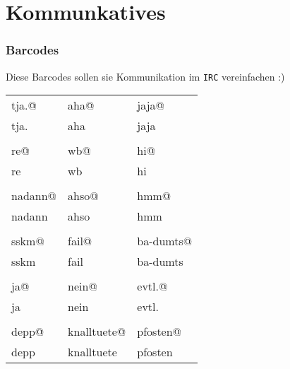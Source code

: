 \documentclass[oneside,12pt,a4paper]{scrartcl}
\makeatletter
\newcommand{\barcode}[1]{{\xlix@#1@}}
\makeatother
\begin{document}
\part{Kommunkatives}

\newpage
\section{Barcodes}
Diese Barcodes sollen sie Kommunikation im \texttt{IRC} vereinfachen :) \newline

\begin{tabularx}{\textwidth}{m{5cm}m{5cm}m{5cm}}
  \barcode{tja.} & \barcode{aha} & \barcode{jaja} \\
   tja. & aha & jaja \\

\\
  \barcode{re} & \barcode{wb} & \barcode{hi} \\
   re & wb & hi \\

\\
  \barcode{nadann} & \barcode{ahso} & \barcode{hmm} \\
   nadann & ahso & hmm \\

\\
  \barcode{sskm} & \barcode{fail} & \barcode{ba-dumts} \\
   sskm & fail & ba-dumts \\

\\
  \barcode{ja} & \barcode{nein} & \barcode{evtl.} \\
   ja & nein & evtl. \\

\\
  \barcode{depp} & \barcode{knalltuete} & \barcode{pfosten} \\
   depp & knalltuete & pfosten \\
\end{tabularx}
\end{document}
